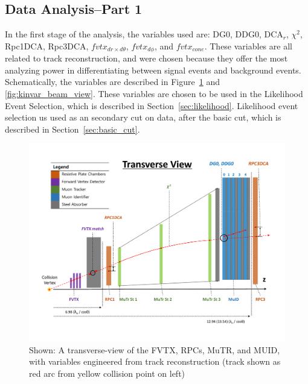\subsection{Data Analysis--Part 1}

In the first stage of the analysis, the variables used are: DG0, DDG0, DCA$_r$,
$\chi^2$, Rpc1DCA, Rpc3DCA, $fvtx_{dr \times d\theta}$, $fvtx_{d\phi}$, and
$fvtx_{cone}$. These variables are all related to track reconstruction, and were
chosen because they offer the most analyzing power in differentiating between
signal events and background events. Schematically, the variables are described
in Figure~\ref{fig:kinvar_side_view} and \ref{fig:kinvar_beam_view}. These
variables are chosen to be used in the Likelihood Event Selection, which is
described in Section~\ref{sec:likelihood}. Likelihood event selection us used as
an secondary cut on data, after the basic cut, which is described in
Section~\ref{sec:basic_cut}.

\begin{figure}[ht]
  \centering
  \includegraphics[width=\textwidth]{./figures/kinvar_side_view.pdf}
  \caption{
    Shown: A transverse-view of the FVTX, RPCs, MuTR, and MUID, with
    variables engineered from track reconstruction (track shown as red arc from
    yellow collision point on left)~\cite{Kim2016}
  }
  \label{fig:kinvar_side_view}
\end{figure}
    
